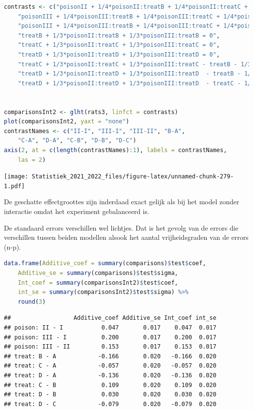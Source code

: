 \documentclass[
  12pt,dutch,coursenotes]{book}
\theoremstyle{definition}
\theoremstyle{definition}
\theoremstyle{definition}
\theoremstyle{definition}
\theoremstyle{remark}
\begin{document}
\begin{lstlisting}[language=R]
contrasts <- c("poisonII + 1/4*poisonII:treatB + 1/4*poisonII:treatC + 1/4*poisonII:treatD = 0",
    "poisonIII + 1/4*poisonIII:treatB + 1/4*poisonIII:treatC + 1/4*poisonIII:treatD= 0",
    "poisonIII + 1/4*poisonIII:treatB + 1/4*poisonIII:treatC + 1/4*poisonIII:treatD - poisonII - 1/4*poisonII:treatB - 1/4*poisonII:treatC - 1/4*poisonII:treatD = 0",
    "treatB + 1/3*poisonII:treatB + 1/3*poisonIII:treatB = 0",
    "treatC + 1/3*poisonII:treatC + 1/3*poisonIII:treatC = 0",
    "treatD + 1/3*poisonII:treatD + 1/3*poisonIII:treatD = 0",
    "treatC + 1/3*poisonII:treatC + 1/3*poisonIII:treatC - treatB - 1/3*poisonII:treatB - 1/3*poisonIII:treatB = 0",
    "treatD + 1/3*poisonII:treatD + 1/3*poisonIII:treatD  - treatB - 1/3*poisonII:treatB - 1/3*poisonIII:treatB = 0",
    "treatD + 1/3*poisonII:treatD + 1/3*poisonIII:treatD  - treatC - 1/3*poisonII:treatC - 1/3*poisonIII:treatC = 0")


comparisonsInt2 <- glht(rats3, linfct = contrasts)
plot(comparisonsInt2, yaxt = "none")
contrastNames <- c("II-I", "III-I", "III-II", "B-A",
    "C-A", "D-A", "C-B", "D-B", "D-C")
axis(2, at = c(length(contrastNames):1), labels = contrastNames,
    las = 2)
\end{lstlisting}

\texttt{[image: Statistiek\_2021\_2022\_files/figure-latex/unnamed-chunk-279-1.pdf]}

De geschatte effectgroottes zijn inderdaad exact gelijk als bij het model zonder interactie omdat het experiment gebalanceerd is.

De standaard errors verschillen wel lichtjes.
Dat is het gevolg van de errors die verschillen tussen beiden modellen alsook het aantal vrijheidsgraden van de errors (n-p).

\begin{lstlisting}[language=R]
data.frame(Additive_coef = summary(comparisons)$test$coef,
    Additive_se = summary(comparisons)$test$sigma,
    Int_coef = summary(comparisonsInt2)$test$coef,
    int_se = summary(comparisonsInt2)$test$sigma) %>%
    round(3)
\end{lstlisting}

\begin{lstlisting}
##                  Additive_coef Additive_se Int_coef int_se
## poison: II - I           0.047       0.017    0.047  0.017
## poison: III - I          0.200       0.017    0.200  0.017
## poison: III - II         0.153       0.017    0.153  0.017
## treat: B - A            -0.166       0.020   -0.166  0.020
## treat: C - A            -0.057       0.020   -0.057  0.020
## treat: D - A            -0.136       0.020   -0.136  0.020
## treat: C - B             0.109       0.020    0.109  0.020
## treat: D - B             0.030       0.020    0.030  0.020
## treat: D - C            -0.079       0.020   -0.079  0.020
\end{lstlisting}
\end{document}
